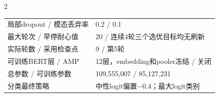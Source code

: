 \begin{PaperTable}{2}
\begin{table}[!htbp]
\begin{tabular}{@{}ll@{}}
\begin{minipage}[t]{\dimexpr 0.440000\linewidth-0.880000\tabcolsep\relax}
局部dropout / 模态丢弃率\strut
\end{minipage} & \begin{minipage}[t]{\dimexpr 0.560000\linewidth-1.120000\tabcolsep\relax}\raggedright
0.2 / 0.1\strut
\end{minipage}\tabularnewline
\begin{minipage}[t]{\dimexpr 0.440000\linewidth-0.880000\tabcolsep\relax}\raggedright
最大轮次 / 早停耐心值\strut
\end{minipage} & \begin{minipage}[t]{\dimexpr 0.560000\linewidth-1.120000\tabcolsep\relax}\raggedright
20 / 连续4轮三个选优目标均无刷新\strut
\end{minipage}\tabularnewline
\begin{minipage}[t]{\dimexpr 0.440000\linewidth-0.880000\tabcolsep\relax}\raggedright
实际轮数 / 采用检查点\strut
\end{minipage} & \begin{minipage}[t]{\dimexpr 0.560000\linewidth-1.120000\tabcolsep\relax}\raggedright
9 / 第5轮\strut
\end{minipage}\tabularnewline
\begin{minipage}[t]{\dimexpr 0.440000\linewidth-0.880000\tabcolsep\relax}\raggedright
可训练BERT层 / AMP\strut
\end{minipage} & \begin{minipage}[t]{\dimexpr 0.560000\linewidth-1.120000\tabcolsep\relax}\raggedright
12层，embedding和pooler冻结 / 关闭\strut
\end{minipage}\tabularnewline
\begin{minipage}[t]{\dimexpr 0.440000\linewidth-0.880000\tabcolsep\relax}\raggedright
总参数 / 可训练参数\strut
\end{minipage} & \begin{minipage}[t]{\dimexpr 0.560000\linewidth-1.120000\tabcolsep\relax}\raggedright
109,555,007 / 85,127,231\strut
\end{minipage}\tabularnewline
\begin{minipage}[t]{\dimexpr 0.440000\linewidth-0.880000\tabcolsep\relax}\raggedright
分类最终策略\strut
\end{minipage} & \begin{minipage}[t]{\dimexpr 0.560000\linewidth-1.120000\tabcolsep\relax}\raggedright
中性logit偏置−0.4；最大logit类别\strut
\end{minipage}\tabularnewline
\bottomrule
\end{tabular}
\end{table}

\end{PaperTable}

